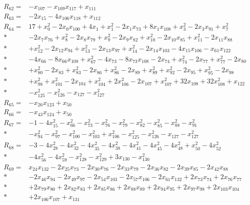 \begin{align*}
R_{62}={}&-x_{107}-x_{109}x_{117}+x_{111}\\[3pt]
R_{63}={}&-2x_{15}-4x_{106}x_{118}+x_{112}\\[3pt]
R_{64}={}&17+x_{0}^{2}-2x_{0}x_{100}+4x_{1}+x_{1}^{2}-2x_{1}x_{73}+8x_{1}x_{108}+x_{3}^{2}-2x_{3}x_{91}+x_{7}^{2}\\*
&-2x_{7}x_{76}+x_{8}^{2}-2x_{8}x_{79}+x_{9}^{2}-2x_{9}x_{82}+x_{10}^{2}-2x_{10}x_{85}+x_{11}^{2}-2x_{11}x_{88}\\*
&+x_{12}^{2}-2x_{12}x_{94}+x_{13}^{2}-2x_{13}x_{97}+x_{14}^{2}-2x_{14}x_{103}-4x_{15}x_{106}-x_{61}x_{122}\\*
&-4x_{66}-8x_{66}x_{108}+x_{67}^{2}-4x_{73}-8x_{73}x_{108}-2x_{74}+x_{74}^{2}-2x_{77}+x_{77}^{2}-2x_{80}\\*
&+x_{80}^{2}-2x_{83}+x_{83}^{2}-2x_{86}+x_{86}^{2}-2x_{89}+x_{89}^{2}+x_{92}^{2}-2x_{95}+x_{95}^{2}-2x_{98}\\*
&+x_{98}^{2}+x_{101}^{2}-2x_{104}+x_{104}^{2}+2x_{106}^{2}-2x_{107}+x_{107}^{2}+32x_{108}+32x_{108}^{2}+x_{122}\\*
&-x_{125}^{2}-x_{126}^{2}-x_{127}-x_{127}^{2}\\[3pt]
R_{65}={}&-x_{26}x_{123}+x_{50}\\[3pt]
R_{66}={}&-x_{43}x_{124}+x_{50}\\[3pt]
R_{67}={}&-1-4x_{15}^{2}-x_{66}^{2}-x_{73}^{2}-x_{76}^{2}-x_{79}^{2}-x_{82}^{2}-x_{85}^{2}-x_{88}^{2}-x_{91}^{2}\\*
&-x_{94}^{2}-x_{97}^{2}-x_{100}^{2}-x_{103}^{2}+x_{106}^{2}-x_{125}^{2}-x_{126}^{2}-x_{127}-x_{127}^{2}\\[3pt]
R_{68}={}&-3-4x_{28}^{2}-4x_{32}^{2}-4x_{35}^{2}-4x_{38}^{2}-4x_{41}^{2}-4x_{45}^{2}-4x_{48}^{2}+x_{50}^{2}-4x_{52}^{2}\\*
&-4x_{56}^{2}-4x_{59}^{2}-x_{128}^{2}-x_{129}^{2}+3x_{130}-x_{130}^{2}\\[3pt]
R_{69}={}&x_{24}x_{132}-2x_{25}x_{73}-2x_{30}x_{76}-2x_{33}x_{79}-2x_{36}x_{82}-2x_{39}x_{85}-2x_{42}x_{88}\\*
&-2x_{46}x_{94}-2x_{49}x_{97}-2x_{54}x_{103}-2x_{57}x_{106}-2x_{61}x_{132}+2x_{73}x_{74}+2x_{76}x_{77}\\*
&+2x_{79}x_{80}+2x_{82}x_{83}+2x_{85}x_{86}+2x_{88}x_{89}+2x_{94}x_{95}+2x_{97}x_{98}+2x_{103}x_{104}\\*
&+2x_{106}x_{107}+x_{131}\\[3pt]

\end{align*}
